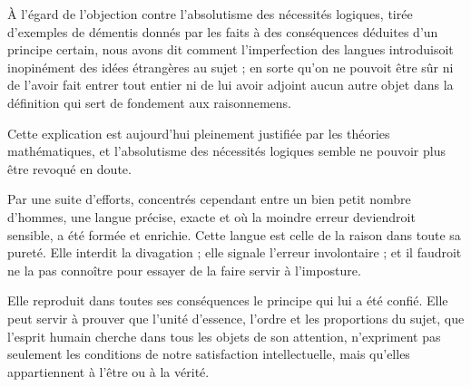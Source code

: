 \documentclass[11pt,a4paper]{article}
\begin{document}
À l'égard de l'objection contre l'absolutisme des nécessités logiques,
tirée d'exemples de démentis donnés par les faits à des conséquences
déduites d'un principe certain, nous avons dit comment l'imperfection des
langues introduisoit inopinément des idées étrangères au sujet ; en sorte
qu'on ne pouvoit être sûr ni de l'avoir fait entrer tout entier ni de lui
avoir adjoint aucun autre objet dans la définition qui sert de fondement
aux raisonnemens.

Cette explication est aujourd'hui pleinement justifiée par les théories
mathématiques, et l'absolutisme des nécessités logiques semble ne pouvoir
plus être revoqué en doute.

Par une suite d'efforts, concentrés cependant entre un bien petit nombre
d'hommes, une langue précise, exacte et où la moindre erreur deviendroit
sensible, a été formée et enrichie. Cette langue est celle de la raison
dans toute sa pureté. Elle  interdit la divagation ;
elle signale l'erreur involontaire ; et il faudroit ne la pas connoître
pour essayer de la faire servir à l'imposture. 


Elle reproduit dans toutes ses conséquences le principe qui lui a été
confié. Elle  peut servir à prouver que l'unité
d'essence, l'ordre et les proportions du sujet, que l'esprit humain
cherche  dans tous les objets de son attention,
 n'expriment pas seulement  les conditions de notre satisfaction
intellectuelle, mais  qu'elles
appartiennent à l'être ou à la vérité.
\end{document}
